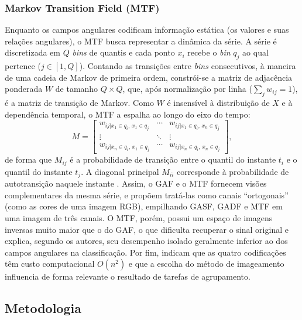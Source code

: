 \subsubsection{Markov Transition Field (MTF)}

Enquanto os campos angulares codificam informação estática (os valores e suas relações angulares), o MTF busca representar a dinâmica da série. A série é discretizada em $Q$ \textit{bins} de quantis e cada ponto $x_i$ recebe o \textit{bin} $q_j$ ao qual pertence ($j \in [1,Q]$). Contando as transições entre \textit{bins} consecutivos, à maneira de uma cadeia de Markov de primeira ordem, constrói-se a matriz de adjacência ponderada $W$ de tamanho $Q \times Q$, que, após normalização por linha ($\sum_j w_{ij}=1$), é a matriz de transição de Markov. Como $W$ é insensível à distribuição de $X$ e à dependência temporal, o MTF a espalha ao longo do eixo do tempo:
\begin{equation}
M = \begin{bmatrix}
w_{ij|x_1 \in q_i,\, x_1 \in q_j} & \cdots & w_{ij|x_1 \in q_i,\, x_n \in q_j}\\
\vdots & \ddots & \vdots\\
w_{ij|x_n \in q_i,\, x_1 \in q_j} & \cdots & w_{ij|x_n \in q_i,\, x_n \in q_j}
\end{bmatrix},
\label{eq:mtf}
\end{equation}
de forma que $M_{ij}$ é a probabilidade de transição entre o quantil do instante $t_i$ e o quantil do instante $t_j$. A diagonal principal $M_{ii}$ corresponde à probabilidade de autotransição naquele instante \cite{wang2015imaging}. Assim, o GAF e o MTF fornecem visões complementares da mesma série, e \cite{wang2015imaging} propõem tratá-las como canais ``ortogonais'' (como as cores de uma imagem RGB), empilhando GASF, GADF e MTF em uma imagem de três canais. O MTF, porém, possui um espaço de imagens inversas muito maior que o do GAF, o que dificulta recuperar o sinal original e explica, segundo os autores, seu desempenho isolado geralmente inferior ao dos campos angulares na classificação. Por fim, \cite{wu2023imaging} indicam que as quatro codificações têm custo computacional $O(n^2)$ e que a escolha do método de imageamento influencia de forma relevante o resultado de tarefas de agrupamento.

\subsection{Metodologia}

